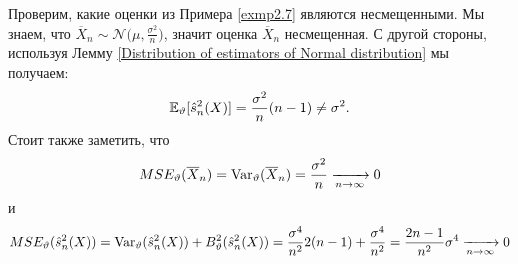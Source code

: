 \begin{exmp} \label{Biasedness of estimators for normal distribution}
	Проверим, какие оценки из Примера \ref{exmp2.7} являются несмещенными. Мы знаем, что $\overline{X}_n \sim \mathcal{N}\Big(\mu, \frac{\sigma^2}{n}\Big)$, значит оценка $\overline{X}_n$ несмещенная. С другой стороны, используя Лемму \ref{Distribution of estimators of Normal distribution} мы получаем:
	\[ \mathbb{E}_\vartheta[\hat{s}_n^2(X)]=\frac{\sigma^2}{n}(n-1) \neq \sigma^2. \]
	Стоит также заметить, что 
	\[ MSE_\vartheta(\overline{X}_n)=\mathrm{Var}_\vartheta(\overline{X}_n)=\frac{\sigma^2}{n} \xrightarrow[n \rightarrow \infty]{} 0\]
	и
	\[ MSE_\vartheta(\hat{s}_n^2(X))=\mathrm{Var}_\vartheta(\hat{s}_n^2(X))+B_\vartheta^2(\hat{s}_n^2(X))=\frac{\sigma^4}{n^2}2(n-1)+\frac{\sigma^4}{n^2}=\frac{2n-1}{n^2}\sigma^4 \xrightarrow[n \rightarrow \infty]{} 0
	\]
\end{exmp}

